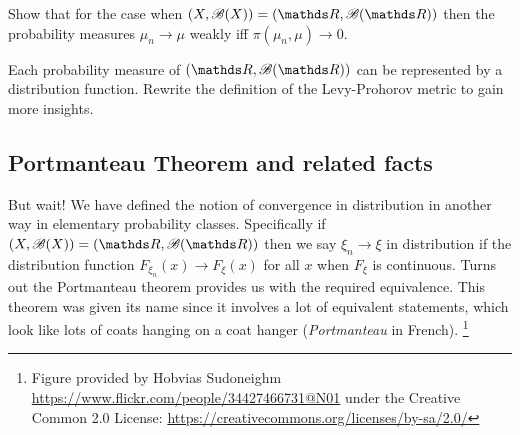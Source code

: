 \begin{unexaminable}
\begin{exercise}
Show that for the case when $(X,\B(X)) = (\R,\B(\R))$ then the probability measures $\mu_n \to \mu$ weakly iff $\pi(\mu_n, \mu) \to 0$.  
\end{exercise}

\begin{hint}
Each probability measure of $(\R,\B(\R))$ can be represented by a distribution function. Rewrite the definition of the Levy-Prohorov metric to gain more insights.
\end{hint}
\end{unexaminable}

\subsection{Portmanteau Theorem and related facts}
But wait! We have defined the notion of convergence in distribution in another way in elementary probability classes. Specifically if $(X,\B(X)) = (\R, \B(\R))$ then we say $\xi_n \to \xi$ in distribution if the distribution function $F_{\xi_n}(x) \to F_{\xi}(x)$ for all $x$ when $F_\xi$ is continuous. Turns out the Portmanteau theorem provides us with the required equivalence. This theorem was given its name since it involves a lot of equivalent statements, which look like lots of coats hanging on a coat hanger (\textit{Portmanteau} in French). \footnote{Figure provided by Hobvias Sudoneighm \url{https://www.flickr.com/people/34427466731@N01} under the Creative Common 2.0 License: \url{https://creativecommons.org/licenses/by-sa/2.0/}}

